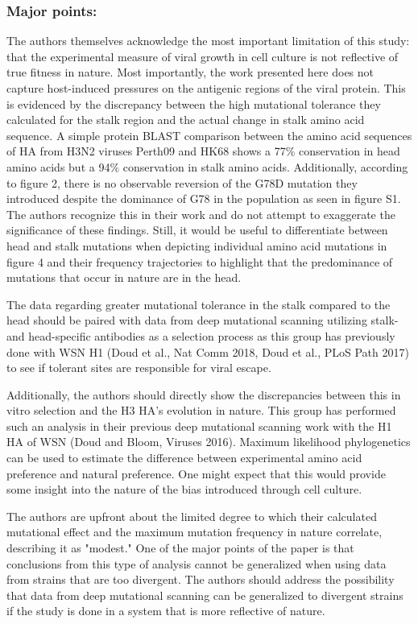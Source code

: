 \documentclass[11pt, oneside]{article}   	%
\begin{document}
\subsubsection*{Major points:} 

The authors themselves acknowledge the most important limitation of this study: that the experimental measure of viral growth in cell culture is not reflective of true fitness in nature. Most importantly, the work presented here does not capture host-induced pressures on the antigenic regions of the viral protein. This is evidenced by the discrepancy between the high mutational tolerance they calculated for the stalk region and the actual change in stalk amino acid sequence. A simple protein BLAST comparison between the amino acid sequences of HA from H3N2 viruses Perth09 and HK68 shows a 77\% conservation in head amino acids but a 94\% conservation in stalk amino acids. Additionally, according to figure 2, there is no observable reversion of the G78D mutation they introduced despite the dominance of G78 in the population as seen in figure S1. The authors recognize this in their work and do not attempt to exaggerate the significance of these findings. Still, it would be useful to differentiate between head and stalk mutations when depicting individual amino acid mutations in figure 4 and their frequency trajectories to highlight that the predominance of mutations that occur in nature are in the head. 

The data regarding greater mutational tolerance in the stalk compared to the head should be paired with data from deep mutational scanning utilizing stalk- and head-specific antibodies as a selection process as this group has previously done with WSN H1 (Doud et al., Nat Comm 2018, Doud et al., PLoS Path 2017) to see if tolerant sites are responsible for viral escape. 

Additionally, the authors should directly show the discrepancies between this in vitro selection and the H3 HA's evolution in nature. This group has performed such an analysis in their previous deep mutational scanning work with the H1 HA of WSN (Doud and Bloom, Viruses 2016). Maximum likelihood phylogenetics can be used to estimate the difference between experimental amino acid preference and natural preference. One might expect that this would provide some insight into the nature of the bias introduced through cell culture. 

The authors are upfront about the limited degree to which their calculated mutational effect and the maximum mutation frequency in nature correlate, describing it as "modest." One of the major points of the paper is that conclusions from this type of analysis cannot be generalized when using data from strains that are too divergent. The authors should address the possibility that data from deep mutational scanning can be generalized to divergent strains if the study is done in a system that is more reflective of nature. 
\end{document}
